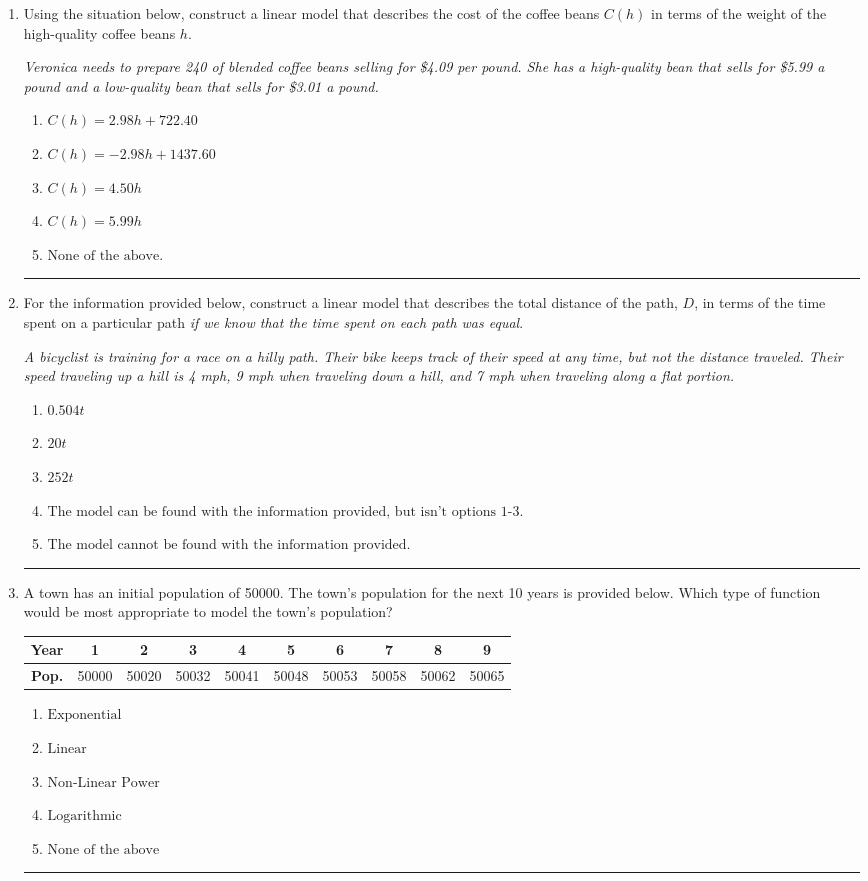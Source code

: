 \documentclass[14pt]{extbook}
\newcommand{\litem}[1]{\item#1\hspace*{-1cm}\rule{\textwidth}{0.4pt}}
\begin{document}
\begin{enumerate}
{\begin{enumerate}[label=\Alph*.]
\end{enumerate} }
\litem{
Using the situation below, construct a linear model that describes the cost of the coffee beans $C(h)$ in terms of the weight of the high-quality coffee beans $h$.
\begin{center}
    \textit{ Veronica needs to prepare 240 of blended coffee beans selling for \$4.09 per pound. She has a high-quality bean that sells for \$5.99 a pound and a low-quality bean that sells for \$3.01 a pound. }
\end{center}
\begin{enumerate}[label=\Alph*.]
\item \( C(h) = 2.98 h + 722.40 \)
\item \( C(h) = -2.98 h + 1437.60 \)
\item \( C(h) = 4.50 h \)
\item \( C(h) = 5.99 h \)
\item \( \text{None of the above.} \)

\end{enumerate} }
\litem{
For the information provided below, construct a linear model that describes the total distance of the path, $D$, in terms of the time spent on a particular path \textit{if we know that the time spent on each path was equal}.
\begin{center}
    \textit{ A bicyclist is training for a race on a hilly path. Their bike keeps track of their speed at any time, but not the distance traveled. Their speed traveling up a hill is 4 mph, 9 mph when traveling down a hill, and 7 mph when traveling along a flat portion. }
\end{center}
\begin{enumerate}[label=\Alph*.]
\item \( 0.504 t \)
\item \( 20 t \)
\item \( 252 t \)
\item \( \text{The model can be found with the information provided, but isn't options 1-3.} \)
\item \( \text{The model cannot be found with the information provided.} \)

\end{enumerate} }
\litem{
A town has an initial population of 50000. The town's population for the next 10 years is provided below. Which type of function would be most appropriate to model the town's population?


\begin{tabular}{c|c|c|c|c|c|c|c|c|c}
\textbf{Year} & 1 & 2 & 3 & 4 & 5 & 6 & 7 & 8 & 9 \tabularnewline
\hline
\textbf{Pop.} & 50000 & 50020 & 50032 & 50041 & 50048 & 50053 & 50058 & 50062 & 50065
\end{tabular} \begin{enumerate}[label=\Alph*.]
\item \( \text{Exponential} \)
\item \( \text{Linear} \)
\item \( \text{Non-Linear Power} \)
\item \( \text{Logarithmic} \)
\item \( \text{None of the above} \)


\end{enumerate}}
\end{enumerate}
\end{document}
